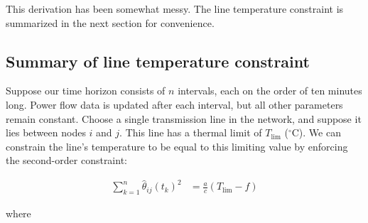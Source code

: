 \documentclass{article}
\begin{document}
This derivation has been somewhat messy. The line temperature constraint is summarized in the next section for convenience.

\subsection{Summary of line temperature
constraint}\label{summary-of-line-temperature-constraint}

Suppose our time horizon consists of $n$ intervals, each on the order of
ten minutes long. Power flow data is updated after each interval, but
all other parameters remain constant. Choose a single transmission
line in the network, and suppose it lies between nodes $i$ and $j$. This line has a
thermal limit of $T_\text{lim}$ ($^\circ$C). We can constrain the
line's temperature to be equal to this limiting value by enforcing the
second-order constraint:

\begin{align}\label{eq:tempconstraint}
\sum_{k=1}^n \hat{\theta}_{ij}(t_k)^2 &= \frac{a}{c}\left(T_\text{lim} - f\right)
\end{align}

where
\end{document}
